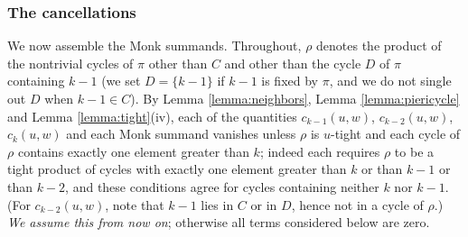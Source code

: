 \documentclass{amsart}
\theoremstyle{definition}
\theoremstyle{remark}
\numberwithin{equation}{section}
\begin{document}
\subsubsection*{The cancellations}

We now assemble the Monk summands. Throughout, $\rho$ denotes the product of the nontrivial cycles of $\pi$ other than $C$ and other than the cycle $D$ of $\pi$ containing $k-1$ (we set $D=\{k-1\}$ if $k-1$ is fixed by $\pi$, and we do not single out $D$ when $k-1\in C$). By Lemma \ref{lemma:neighbors}, Lemma \ref{lemma:piericycle} and Lemma \ref{lemma:tight}(iv), each of the quantities $c_{k-1}(u,w)$, $c_{k-2}(u,w)$, $c_k(u,w)$ and each Monk summand vanishes unless $\rho$ is $u$-tight and each cycle of $\rho$ contains exactly one element greater than $k$; indeed each requires $\rho$ to be a tight product of cycles with exactly one element greater than $k$ or than $k-1$ or than $k-2$, and these conditions agree for cycles containing neither $k$ nor $k-1$. (For $c_{k-2}(u,w)$, note that $k-1$ lies in $C$ or in $D$, hence not in a cycle of $\rho$.) \emph{We assume this from now on}; otherwise all terms considered below are zero.
\end{document}
